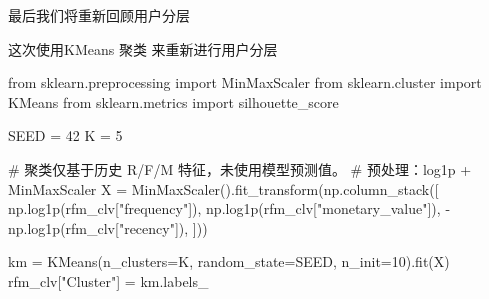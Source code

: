 \documentclass[
]{ctexart}
\newenvironment{Shaded}{\begin{snugshade}}{\end{snugshade}}
\newcommand{\CommentTok}[1]{\textcolor[rgb]{0.37,0.37,0.37}{#1}}
\newcommand{\DecValTok}[1]{\textcolor[rgb]{0.68,0.00,0.00}{#1}}
\newcommand{\ImportTok}[1]{\textcolor[rgb]{0.00,0.46,0.62}{#1}}
\newcommand{\NormalTok}[1]{\textcolor[rgb]{0.00,0.23,0.31}{#1}}
\newcommand{\OperatorTok}[1]{\textcolor[rgb]{0.37,0.37,0.37}{#1}}
\newcommand{\StringTok}[1]{\textcolor[rgb]{0.13,0.47,0.30}{#1}}
\begin{document}
最后我们将重新回顾用户分层

这次使用KMeans 聚类 来重新进行用户分层

\begin{Shaded}
\begin{Highlighting}[]
\ImportTok{from}\NormalTok{ sklearn.preprocessing }\ImportTok{import}\NormalTok{ MinMaxScaler}
\ImportTok{from}\NormalTok{ sklearn.cluster }\ImportTok{import}\NormalTok{ KMeans}
\ImportTok{from}\NormalTok{ sklearn.metrics }\ImportTok{import}\NormalTok{ silhouette\_score}

\NormalTok{SEED }\OperatorTok{=} \DecValTok{42}
\NormalTok{K }\OperatorTok{=} \DecValTok{5}

\CommentTok{\# 聚类仅基于历史 R/F/M 特征，未使用模型预测值。}
\CommentTok{\# 预处理：log1p + MinMaxScaler}
\NormalTok{X }\OperatorTok{=}\NormalTok{ MinMaxScaler().fit\_transform(np.column\_stack([}
\NormalTok{    np.log1p(rfm\_clv[}\StringTok{"frequency"}\NormalTok{]),}
\NormalTok{    np.log1p(rfm\_clv[}\StringTok{"monetary\_value"}\NormalTok{]),}
    \OperatorTok{{-}}\NormalTok{np.log1p(rfm\_clv[}\StringTok{"recency"}\NormalTok{]),}
\NormalTok{]))}

\NormalTok{km }\OperatorTok{=}\NormalTok{ KMeans(n\_clusters}\OperatorTok{=}\NormalTok{K, random\_state}\OperatorTok{=}\NormalTok{SEED, n\_init}\OperatorTok{=}\DecValTok{10}\NormalTok{).fit(X)}
\NormalTok{rfm\_clv[}\StringTok{"Cluster"}\NormalTok{] }\OperatorTok{=}\NormalTok{ km.labels\_}
\end{Highlighting}
\end{Shaded}
\end{document}
